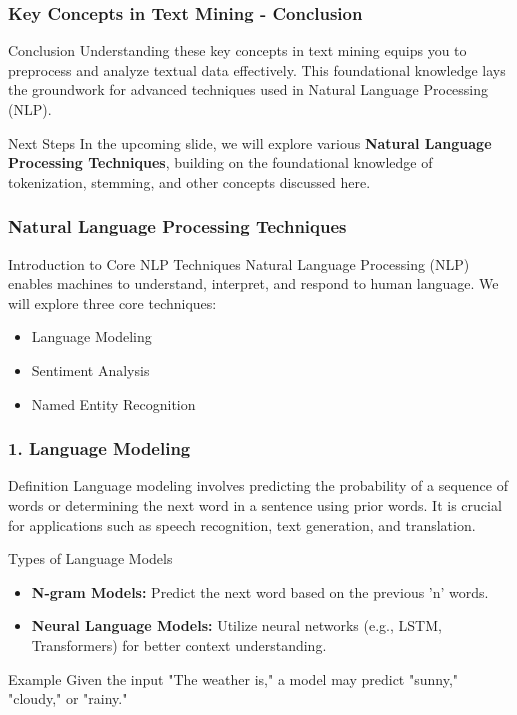 \documentclass[aspectratio=169]{beamer}
\begin{document}
\begin{frame}[fragile]
    \frametitle{Key Concepts in Text Mining - Conclusion}
    \begin{block}{Conclusion}
        Understanding these key concepts in text mining equips you to preprocess and analyze textual data effectively. 
        This foundational knowledge lays the groundwork for advanced techniques used in Natural Language Processing (NLP).
    \end{block}
    
    \begin{block}{Next Steps}
        In the upcoming slide, we will explore various \textbf{Natural Language Processing Techniques}, building on the foundational knowledge of tokenization, stemming, and other concepts discussed here.
    \end{block}
\end{frame}

\begin{frame}
    \frametitle{Natural Language Processing Techniques}
    \begin{block}{Introduction to Core NLP Techniques}
        Natural Language Processing (NLP) enables machines to understand, interpret, and respond to human language. We will explore three core techniques:
        \begin{itemize}
            \item Language Modeling
            \item Sentiment Analysis
            \item Named Entity Recognition
        \end{itemize}
    \end{block}
\end{frame}

\begin{frame}
    \frametitle{1. Language Modeling}
    \begin{block}{Definition}
        Language modeling involves predicting the probability of a sequence of words or determining the next word in a sentence using prior words. It is crucial for applications such as speech recognition, text generation, and translation.
    \end{block}
    
    \begin{block}{Types of Language Models}
        \begin{itemize}
            \item \textbf{N-gram Models:} Predict the next word based on the previous 'n' words.
            \item \textbf{Neural Language Models:} Utilize neural networks (e.g., LSTM, Transformers) for better context understanding.
        \end{itemize}
    \end{block}
    
    \begin{block}{Example}
        Given the input "The weather is," a model may predict "sunny," "cloudy," or "rainy."
    \end{block}
\end{frame}
\end{document}
